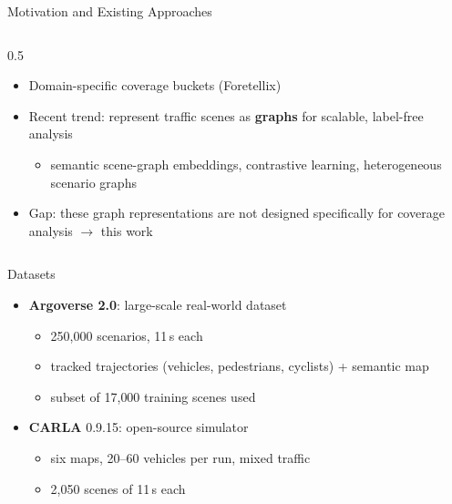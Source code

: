 \documentclass[aspectratio=169]{beamer}
\begin{document}
\begin{frame}{Motivation and Existing Approaches}
\begin{columns}[t]
\begin{column}{0.5\textwidth}
\begin{itemize}[itemsep=1pt,topsep=1pt,parsep=0pt]
    \item Domain-specific coverage buckets (Foretellix)
    \item Recent trend: represent traffic scenes as \textbf{graphs} for scalable, label-free analysis
    \begin{itemize}[itemsep=1pt,topsep=1pt,parsep=0pt]
        \item semantic scene-graph embeddings, contrastive learning, heterogeneous scenario graphs
    \end{itemize}
    \item Gap: these graph representations are not designed specifically for coverage analysis $\rightarrow$ this work
\end{itemize}
\end{column}
\end{columns}
\end{frame}

\begin{frame}{Datasets}
\begin{itemize}
    \item \textbf{Argoverse 2.0}: large-scale real-world dataset
    \begin{itemize}
        \item 250{,}000 scenarios, 11\,s each
        \item tracked trajectories (vehicles, pedestrians, cyclists) + semantic map
        \item subset of 17{,}000 training scenes used
    \end{itemize}
    \item \textbf{CARLA} 0.9.15: open-source simulator
    \begin{itemize}
        \item six maps, 20--60 vehicles per run, mixed traffic
        \item 2{,}050 scenes of 11\,s each
    \end{itemize}
\end{itemize}
\end{frame}
\end{document}
